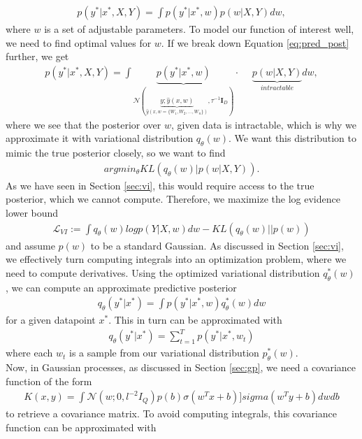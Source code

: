 \documentclass[a4paper,cleardoubleempty,BCOR1cm, 11pt]{report}
\begin{document}
\begin{align}\label{eq:pred_post}
 p(y^*|x^*, X,Y) = \int p(y^*|x^*, w)p(w|X,Y)dw,
\end{align}
where $w$ is a set of adjustable parameters. To model our function of interest well, we need to find optimal values for $w$. If we break down Equation \ref{eq:pred_post} further, we get
\begin{align}
p(y^*|x^*, X,Y) = \int \underbrace{p(y^*|x^*,w)}_{\mathcal{N}(\underbrace{y;\hat{y}(x,w)}_{\hat{y}(x, w=\lbrace W_1, W_2,...,W_n\rbrace)},\tau^{-1}\mathbf{I}_D)} \cdot \hspace{15pt}\underbrace{p(w|X,Y)}_{intractable}dw,
\end{align}
where we see that the posterior over $w$, given data is intractable, which is why we approximate it with variational distribution $q_{\theta}(w)$. We want this distribution to mimic the true posterior closely, so we want to find
\begin{align*}
	argmin_{\theta} KL(q_{\theta}(w)|p(w|X,Y)).
\end{align*}
As we have seen in Section \ref{sec:vi}, this would require access to the true posterior, which we cannot compute. Therefore, we maximize the log evidence lower bound
\begin{align*}
\mathcal{L}_{VI} := \int q_{\theta}(w) log p (Y|X, w)dw - KL(q_{\theta}(w)||p(w))
\end{align*}
and assume $p(w)$ to be a standard Gaussian. As discussed in Section \ref{sec:vi}, we effectively turn computing integrals into an optimization problem, where we need to compute derivatives. Using the optimized variational distribution $q_{\theta}^*(w)$, we can compute an approximate predictive posterior 
\begin{align*}
q_{\theta}(y^*|x^*) = \int p(y^*|x^*, w)q_{\theta}^*(w)dw
\end{align*}
for a given datapoint $x^*$. This in turn can be approximated with
\begin{align*}
q_{\theta}(y^*|x^*) = \sum_{t=1}^{T}p(y^*|x^*, w_t)
\end{align*}
where each $w_t$ is a sample from our variational distribution $p_{\theta}^*(w)$.
\\
Now, in Gaussian processes, as discussed in Section \ref{sec:gp}, we need a covariance function of the form 
\begin{align*}
K(x,y) = \int \mathcal{N}(w;0, l^{-2} I_Q)p(b)\sigma(w^Tx+b)]sigma(w^Ty +b)dwdb
\end{align*}
to retrieve a covariance matrix. To avoid computing integrals, this covariance function can be approximated with
\end{document}
